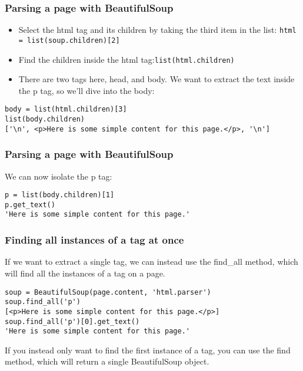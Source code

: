 \begin{frame}[fragile]\frametitle{Parsing a page with BeautifulSoup}
    \begin{itemize}
    \item Select the html tag and its children by taking the third item in the list: \lstinline|html = list(soup.children)[2]|
    \item Find the children inside the html tag:\lstinline|list(html.children)|
    \item There are two tags here, head, and body. We want to extract the text inside the p tag, so we'll dive into the body:
    \end{itemize}
        \begin{lstlisting}
body = list(html.children)[3]
list(body.children)
['\n', <p>Here is some simple content for this page.</p>, '\n']
\end{lstlisting}
\end{frame}

\begin{frame}[fragile]\frametitle{Parsing a page with BeautifulSoup}
We can now isolate the p tag:
        \begin{lstlisting}
p = list(body.children)[1]
p.get_text()
'Here is some simple content for this page.'
\end{lstlisting}
\end{frame}

\begin{frame}[fragile]\frametitle{Finding all instances of a tag at once}
 If we want to extract a single tag, we can instead use the find\_all method, which will find all the instances of a tag on a page.
        \begin{lstlisting}
soup = BeautifulSoup(page.content, 'html.parser')
soup.find_all('p')
[<p>Here is some simple content for this page.</p>]
soup.find_all('p')[0].get_text()
'Here is some simple content for this page.'
\end{lstlisting}
If you instead only want to find the first instance of a tag, you can use the find method, which will return a single BeautifulSoup object.
\end{frame}

